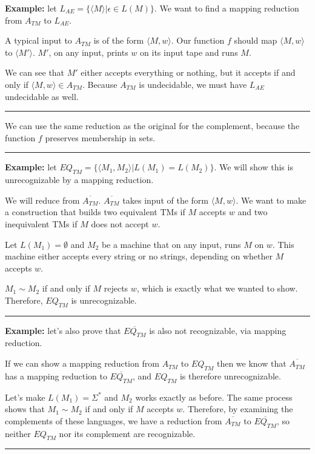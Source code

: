 \documentclass[twoside]{article}
\newenvironment{proof}{{\bf Proof:}}{\hfill\rule{2mm}{2mm}}
\begin{document}
\textbf{Example:} let $L_{AE} = \{\langle M \rangle | \epsilon\in L(M)\}$.  We want to find a mapping reduction from $A_{TM}$ to $L_{AE}$.  

\begin{proof} 
	A typical input to $A_{TM}$ is of the form $\langle M,w\rangle$.  Our function $f$ should map $\langle M,w\rangle$ to $\langle M' \rangle$.  $M'$, on any input, prints $w$ on its input tape and runs $M$.

We can see that $M'$ either accepts everything or nothing, but it accepts if and only if $\langle M,w\rangle\in A_{TM}$.  Because $A_{TM}$ is undecidable, we must have $L_{AE}$ undecidable as well.
\end{proof}


\begin{proof}
	
	We can use the same reduction as the original for the complement, because the function $f$ preserves membership in sets.
	
	
\end{proof}

\textbf{Example:} let $EQ_{TM}=\{\langle M_1,M_2\rangle|L(M_1)=L(M_2)  \}$.  We will show this is unrecognizable by a mapping reduction.


\begin{proof}
We will reduce from $\overline{A_{TM}}$.  $\overline{A_{TM}}$ takes input of the form $\langle M,w\rangle$.  We want to make a construction that builds two equivalent TMs if $M$ accepts $w$ and two inequivalent TMs if $M$ does not accept $w$.

Let $L(M_1) = \emptyset$ and $M_2$ be a machine that on any input, runs $M$ on $w$.  This machine either accepts every string or no strings, depending on whether $M$ accepts $w$.  

$M_1\sim M_2$ if and only if $M$ rejects $w$, which is exactly what we wanted to show.  Therefore, $EQ_{TM}$ is unrecognizable.
\end{proof}

\textbf{Example:} let's also prove that $\overline{EQ_{TM}}$ is also not recognizable, via mapping reduction.  

\begin{proof}
	
If we can show a mapping reduction from $A_{TM}$ to $EQ_{TM}$ then we know that $\overline{A_{TM}}$ has a mapping reduction to $\overline{EQ_{TM}}$, and $EQ_{TM}$ is therefore unrecognizable.

Let's make $L(M_1) = \Sigma^*$ and $M_2$ works exactly as before.  The same process shows that $M_1\sim M_2$ if and only if $M$ accepts $w$.  Therefore, by examining the complements of these languages, we have a reduction from $\overline{A_{TM}}$ to $\overline{EQ_{TM}}$, so neither $EQ_{TM}$ nor its complement are recognizable.
\end{proof}
\end{document}

